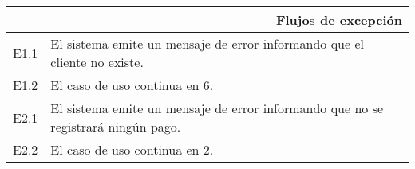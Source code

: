 \begin{tabularx}{\textwidth}{| r | X |}
\hline
\multicolumn{2}{|X|}{
\textbf{Flujos de excepción}} \\

\hline
E1.1 & El sistema emite un mensaje de error informando que el cliente no
existe. \\
\hline
E1.2 & El caso de uso continua en 6. \\

\hline
E2.1 & El sistema emite un mensaje de error informando que no se registrará
ningún pago. \\
\hline
E2.2 & El caso de uso continua en 2. \\

\hline
\end{tabularx}

